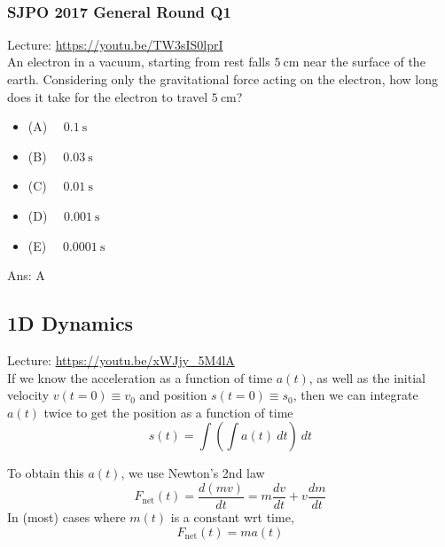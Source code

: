 \documentclass{article}
\begin{document}
\\
\begin{samepage}
\subsubsection{SJPO 2017 General Round Q1} 
Lecture: \url{https://youtu.be/TW3sIS0lprI} \\[10pt]
An electron in a vacuum, starting from rest falls $5 \mathrm{~cm}$ near the surface of the earth. Considering only the gravitational force acting on the electron, how long does it take for the electron to travel $5 \mathrm{~cm}$?
\begin{itemize}
\item[] (A) $\quad 0.1 \mathrm{~s}$
\item[] (B) $\quad 0.03 \mathrm{~s}$
\item[] (C) $\quad 0.01 \mathrm{~s}$
\item[] (D) $\quad 0.001 \mathrm{~s}$
\item[] (E) $\quad 0.0001 \mathrm{~s}$
\end{itemize}
Ans: \ifpaper A \fi
\end{samepage}

\subsection{1D Dynamics}
Lecture: \url{https://youtu.be/xWJjy_5M4lA} \\[10pt]
If we know the acceleration as a function of time $a(t)$, as well as the initial velocity $v(t=0) \equiv v_0$ and position $s(t=0) \equiv s_0$, then we can integrate $a(t)$ twice to get the position as a function of time 
$$s(t) = \int \left(\int a(t)\ dt\right)\ dt$$

To obtain this $a(t)$, we use Newton's 2nd law 
$$F_{\text{net}}(t) = \frac{d(mv)}{dt} = m \frac{dv}{dt} + v \frac{dm}{dt}$$
In (most) cases where $m(t)$ is a constant wrt time, 
$$F_{\text{net}}(t) = ma(t)$$
\end{document}
